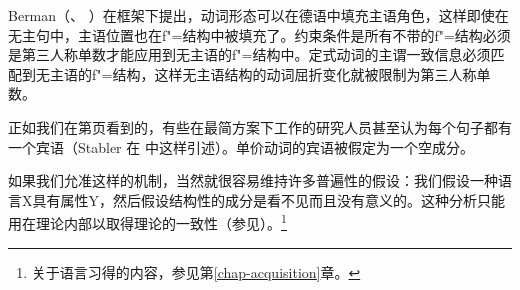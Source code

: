 Berman（\citeyear[]{Berman99a}、
\citeyear[\S~4]{Berman2003a}）在\lfgc 框架下提出，动词形态可以在德语中填充主语角色，这样即使在无主句中，主语位置也在f"=结构中被填充了。约束条件是所有不带\predvc 的f"=结构必须是第三人称单数才能应用到无主语的f"=结构中。定式动词的主谓一致信息必须匹配到无主语的f"=结构，这样无主语结构的动词屈折变化就被限制为第三人称单数\citep{Berman99a}。

正如我们在第\pageref{Seite-leeres-Objekt}页看到的，有些在最简方案下工作的研究人员甚至认为每个句子都有一个宾语（Stabler 在
 \citet[, 124]{Veenstra98a}中这样引述）。单价动词的宾语被假定为一个空成分。
 
如果我们允准这样的机制，当然就很容易维持许多普遍性的假设：我们假设一种语言X具有属性Y，然后假设结构性的成分是看不见而且没有意义的。这种分析只能用在理论内部以取得理论的一致性（参见\citealp[\S~2.1.2]{CJ2005a}）。\footnote{%
 关于语言习得的内容，参见第\ref{chap-acquisition}章。
 }

